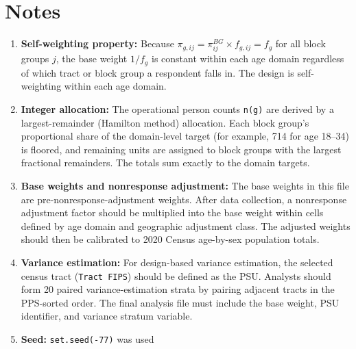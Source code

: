 \documentclass[
  11pt,
]{article}
\begin{document}
\section{Notes}\label{notes}

\begin{enumerate}
\def\labelenumi{\arabic{enumi}.}
\item
  \textbf{Self-weighting property:} Because
  \(\pi_{g,ij} = \pi_{ij}^{BG} \times f_{g,ij} = f_g\) for all block
  groups \(j\), the base weight \(1/f_g\) is constant within each age
  domain regardless of which tract or block group a respondent falls in.
  The design is self-weighting within each age domain.
\item
  \textbf{Integer allocation:} The operational person counts
  \texttt{n(g)} are derived by a largest-remainder (Hamilton method)
  allocation. Each block group's proportional share of the domain-level
  target (for example, 714 for age 18--34) is floored, and remaining
  units are assigned to block groups with the largest fractional
  remainders. The totals sum exactly to the domain targets.
\item
  \textbf{Base weights and nonresponse adjustment:} The base weights in
  this file are pre-nonresponse-adjustment weights. After data
  collection, a nonresponse adjustment factor should be multiplied into
  the base weight within cells defined by age domain and geographic
  adjustment class. The adjusted weights should then be calibrated to
  2020 Census age-by-sex population totals.
\item
  \textbf{Variance estimation:} For design-based variance estimation,
  the selected census tract (\texttt{Tract\ FIPS}) should be defined as
  the PSU. Analysts should form 20 paired variance-estimation strata by
  pairing adjacent tracts in the PPS-sorted order. The final analysis
  file must include the base weight, PSU identifier, and variance
  stratum variable.
\item
  \textbf{Seed:} \texttt{set.seed(-77)} was used
\end{enumerate}
\end{document}
